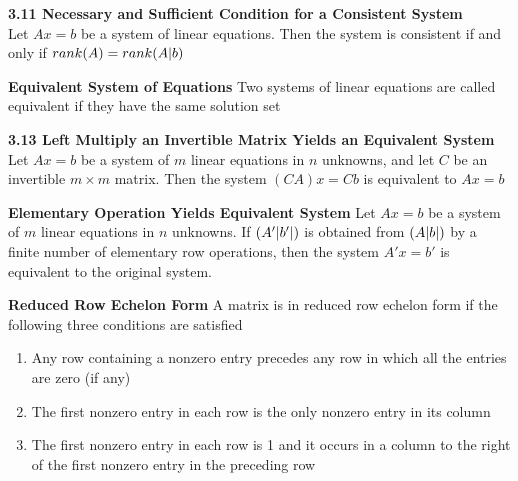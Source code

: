\documentclass[11pt]{article}
\begin{document}
\begin{theorem*}
    \textbf{3.11 Necessary and Sufficient Condition for a Consistent System} \\
    Let $Ax=b$ be a system of linear equations. Then the system is consistent if and only if $rank(A) = rank(A|b)$ 
\end{theorem*}



\begin{defn*}
    \textbf{Equivalent System of Equations} Two systems of linear equations are called equivalent if they have the same solution set
\end{defn*}

\begin{theorem*}
    \textbf{3.13 Left Multiply an Invertible Matrix Yields an Equivalent System}\\
    Let $Ax=b$ be a system of $m$ linear equations in $n$ unknowns, and let $C$ be an invertible $m\times m$ matrix. Then the system $(CA)x=Cb$ is equivalent to $Ax=b$
\end{theorem*}

\begin{corollary*}
    \textbf{Elementary Operation Yields Equivalent System} Let $Ax=b$ be a system of $m$ linear equations in $n$ unknowns. If $\augmatr{A'|b'}$ is obtained from $\augmatr{A|b}$ by a finite number of elementary row operations, then the system $A'x=b'$ is equivalent to the original system.
\end{corollary*}


\begin{defn*}
    \textbf{Reduced Row Echelon Form} A matrix is in reduced row echelon form if the following three conditions are satisfied 
    \begin{enumerate}
        \item Any row containing a nonzero entry precedes any row in which all the entries are zero (if any)
        \item The first nonzero entry in each row is the only nonzero entry in its column 
        \item The first nonzero entry in each row is 1 and it occurs in a column to the right of the first nonzero entry in the preceding row
    \end{enumerate}
\end{defn*}
\end{document}
